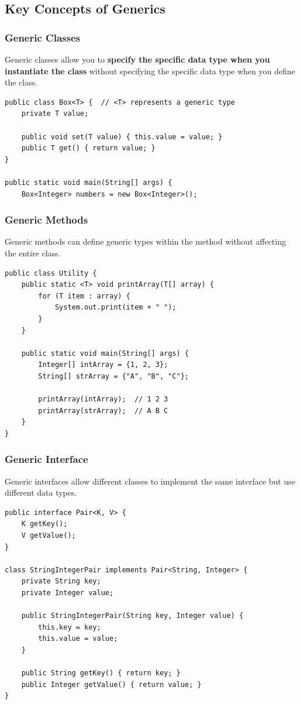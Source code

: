 \documentclass[letterpaper,12pt]{article}
\begin{document}
\subsection{Key Concepts of Generics}
\subsubsection{Generic Classes}
Generic classes allow you to \textbf{specify the specific data type when you instantiate the class} without specifying the specific data type when you define the class.
\begin{verbatim}
public class Box<T> {  // <T> represents a generic type
    private T value;

    public void set(T value) { this.value = value; }
    public T get() { return value; }
}

public static void main(String[] args) {
    Box<Integer> numbers = new Box<Integer>();
\end{verbatim}

\subsubsection{Generic Methods}
Generic methods can define generic types within the method without affecting the entire class.
\begin{verbatim}
public class Utility {
    public static <T> void printArray(T[] array) {
        for (T item : array) {
            System.out.print(item + " ");
        }
    }

    public static void main(String[] args) {
        Integer[] intArray = {1, 2, 3};
        String[] strArray = {"A", "B", "C"};
        
        printArray(intArray);  // 1 2 3
        printArray(strArray);  // A B C
    }
}
\end{verbatim}

\subsubsection{Generic Interface}
Generic interfaces allow different classes to implement the same interface but use different data types.
\begin{verbatim}
public interface Pair<K, V> {
    K getKey();
    V getValue();
}

class StringIntegerPair implements Pair<String, Integer> {
    private String key;
    private Integer value;

    public StringIntegerPair(String key, Integer value) {
        this.key = key;
        this.value = value;
    }

    public String getKey() { return key; }
    public Integer getValue() { return value; }
}
\end{verbatim}
\end{document}
